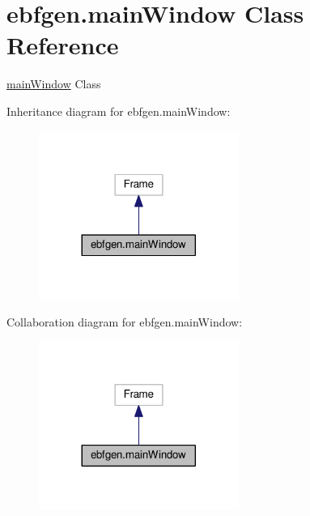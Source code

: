 \hypertarget{classebfgen_1_1mainWindow}{}\section{ebfgen.\+main\+Window Class Reference}
\label{classebfgen_1_1mainWindow}


\hyperlink{classebfgen_1_1mainWindow}{main\+Window} Class  




Inheritance diagram for ebfgen.\+main\+Window\+:
\nopagebreak
\begin{figure}[H]
\begin{center}
\leavevmode
\includegraphics[width=185pt]{classebfgen_1_1mainWindow__inherit__graph}
\end{center}
\end{figure}


Collaboration diagram for ebfgen.\+main\+Window\+:
\nopagebreak
\begin{figure}[H]
\begin{center}
\leavevmode
\includegraphics[width=185pt]{classebfgen_1_1mainWindow__coll__graph}
\end{center}
\end{figure}
